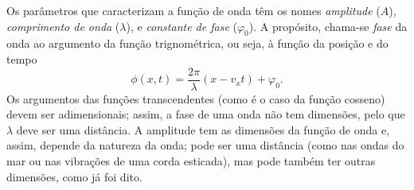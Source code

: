 Os parâmetros que caracterizam a função de onda têm os nomes
\emph{amplitude} ($A$), \emph{comprimento de onda} ($\lambda$), e
\emph{constante de fase} ($\varphi_0$). A propósito, chama-se \emph{fase} da onda
ao argumento da função trignométrica, ou seja, à função da posição e do tempo
\begin{equation}\label{eq:harmonicphase}
\phi(x,t)=\frac{2\pi}{\lambda}(x-v_xt)+\varphi_0.
\end{equation}
Os argumentos das funções transcendentes (como é o caso da função cosseno) devem
ser adimensionais; assim, a fase de uma onda não tem dimensões, pelo que
$\lambda$ deve ser uma distância.  A amplitude tem as dimensões da função de
onda e, assim, depende da natureza da onda; pode ser uma distância (como nas
ondas do mar ou nas vibrações de uma corda esticada), mas pode também ter outras
dimensões, como já foi dito.

